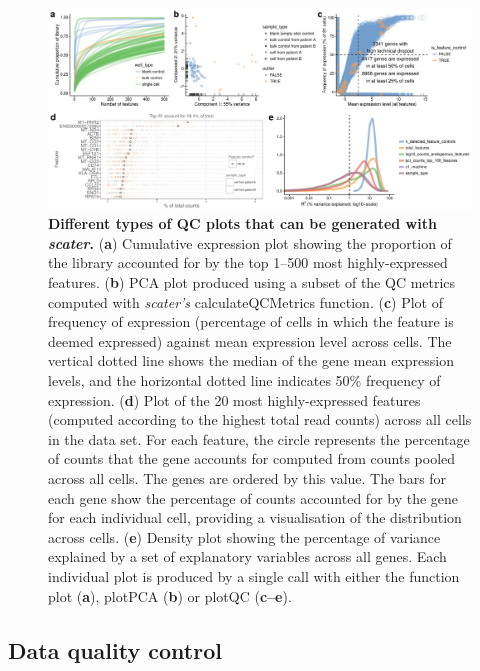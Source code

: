 \documentclass{bioinfo}
\begin{document}
\begin{figure}[!htpb]%
\centerline{\includegraphics[width=\textwidth]{figures/figure3_alt.pdf}}
\caption{\textbf{Different types of QC plots that can be generated with \emph{scater}.} (\textbf{a}) Cumulative expression plot showing the proportion of the library accounted for by the top 1--500 most highly-expressed features. (\textbf{b}) PCA plot produced using a subset of the QC metrics computed with \emph{scater's} calculateQCMetrics function. (\textbf{c}) Plot of frequency of expression (percentage of cells in which the feature is deemed expressed) against mean expression level across cells. The vertical dotted line shows the median of the gene mean expression levels, and the horizontal dotted line indicates 50\% frequency of expression. (\textbf{d}) Plot of the 20 most highly-expressed features (computed according to the highest total read counts) across all cells in the data set. For each feature, the circle represents the percentage of counts that the gene accounts for computed from counts pooled across all cells. The genes are ordered by this value. The bars for each gene show the percentage of counts accounted for by the gene for each individual cell, providing a visualisation of the distribution across cells. (\textbf{e}) Density plot showing the percentage of variance explained by a set of explanatory variables across all genes. Each individual plot is produced by a single call with either the function plot (\textbf{a}), plotPCA (\textbf{b}) or plotQC (\textbf{c--e}).}\label{fig:03}
\end{figure}


\subsection{Data quality control}\label{data-quality-control}
\end{document}
